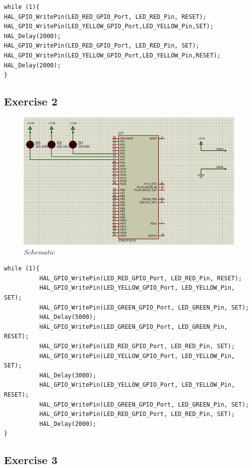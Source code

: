 \begin{lstlisting}[caption= main.c]
while (1){
HAL_GPIO_WritePin(LED_RED_GPIO_Port, LED_RED_Pin, RESET);   
HAL_GPIO_WritePin(LED_YELLOW_GPIO_Port,LED_YELLOW_Pin,SET);
HAL_Delay(2000);
HAL_GPIO_WritePin(LED_RED_GPIO_Port, LED_RED_Pin, SET);
HAL_GPIO_WritePin(LED_YELLOW_GPIO_Port,LED_YELLOW_Pin,RESET); 
HAL_Delay(2000);
}
\end{lstlisting}
\newpage
\subsection{Exercise 2}
\begin{figure}[!htp]
    \centering
    \includegraphics[width=5in]{source/picture/bai_1/pic2.jpg}
    \caption{\textit{Schematic}}
    \label{bai1_pic1}
\end{figure}

\begin{lstlisting}[caption= main.c]
while (1){
	  	  HAL_GPIO_WritePin(LED_RED_GPIO_Port, LED_RED_Pin, RESET);  
	  	  HAL_GPIO_WritePin(LED_YELLOW_GPIO_Port, LED_YELLOW_Pin, SET);
	  	  HAL_GPIO_WritePin(LED_GREEN_GPIO_Port, LED_GREEN_Pin, SET);
	  	  HAL_Delay(5000);
	  	  HAL_GPIO_WritePin(LED_GREEN_GPIO_Port, LED_GREEN_Pin, RESET);
	  	  HAL_GPIO_WritePin(LED_RED_GPIO_Port, LED_RED_Pin, SET);
	  	  HAL_GPIO_WritePin(LED_YELLOW_GPIO_Port, LED_YELLOW_Pin, SET); 
	  	  HAL_Delay(3000);
	  	  HAL_GPIO_WritePin(LED_YELLOW_GPIO_Port, LED_YELLOW_Pin, RESET); 
	  	  HAL_GPIO_WritePin(LED_GREEN_GPIO_Port, LED_GREEN_Pin, SET);
	  	  HAL_GPIO_WritePin(LED_RED_GPIO_Port, LED_RED_Pin, SET);
	  	  HAL_Delay(2000);
}
\end{lstlisting}
\newpage
\subsection{Exercise 3}


